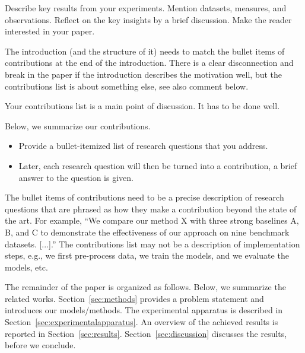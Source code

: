 \documentclass[sigconf, review, nonacm]{acmart}
\begin{document}
Describe key results from your experiments. 
Mention datasets, measures, and observations.
Reflect on the key insights by a brief discussion.
Make the reader interested in your paper.


\begin{tcolorbox}[title=Instruction: Write down your list of contributions.]
The introduction (and the structure of it) needs to match the bullet items of contributions at the end of the introduction. There is a clear disconnection and break in the paper if the introduction describes the motivation well, but the contributions list is about something else, see also comment below. 

Your contributions list is a main point of discussion. 
It has to be done well. 
\end{tcolorbox}

Below, we summarize our contributions.
\begin{itemize}
    \item Provide a bullet-itemized list of research questions that you address. 
    \item Later, each research question will then be turned into a contribution, \ie a brief answer to the question is given. 
\end{itemize}

\begin{tcolorbox}[title=Introduction What is a contribution item and what not.]
The bullet items of contributions need to be a precise description of research questions that are phrased as how they make a contribution beyond the state of the art. 
For example, ``We compare our method X with three strong baselines A, B, and C to demonstrate the effectiveness of our approach on nine benchmark datasets. [...].'' 
The contributions list may not be a description of implementation steps, e.g., we first pre-process data, we train the models, and we evaluate the models, etc. 


\end{tcolorbox}


The remainder of the paper is organized as follows.
%
Below, we summarize the related works.
Section~\ref{sec:methods} provides a problem statement and introduces our models/methods.
The experimental apparatus is described in Section~\ref{sec:experimentalapparatus}.
An overview of the achieved results is reported in Section~\ref{sec:results}. 
Section~\ref{sec:discussion} discusses the results, before we conclude.
\end{document}
